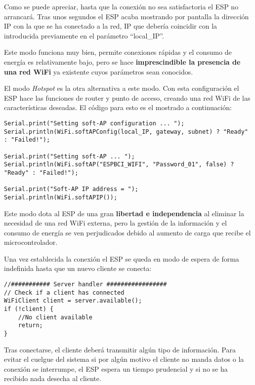 Como se puede apreciar, hasta que la conexión no sea satisfactoria el ESP no arrancará. Tras unos segundos el ESP acaba mostrando por pantalla la dirección IP con la que se ha conectado a la red, IP que debería coincidir con la introducida previamente en el parámetro ``local\_IP''.

Este modo funciona muy bien, permite conexiones rápidas y el consumo de energía es relativamente bajo, pero se hace \textbf{imprescindible la presencia de una red WiFi} ya existente cuyos parámetros sean conocidos.

El modo \textit{Hotspot} es la otra alternativa a este modo. Con esta configuración el ESP hace las funciones de router y punto de acceso, creando una red WiFi de las características deseadas. El código para esto es el mostrado a continuación:

\begin{lstlisting}[label=algoritmo:ESP_Hotspot,style = STM-code,frame=single,caption=Creacion de un punto de acceso en el ESP]
Serial.print("Setting soft-AP configuration ... ");
Serial.println(WiFi.softAPConfig(local_IP, gateway, subnet) ? "Ready" : "Failed!");

Serial.print("Setting soft-AP ... ");
Serial.println(WiFi.softAP("ESPBCI_WIFI", "Password_01", false) ? "Ready" : "Failed!");

Serial.print("Soft-AP IP address = ");
Serial.println(WiFi.softAPIP());
\end{lstlisting}

Este modo dota al ESP de una gran \textbf{libertad e independencia} al eliminar la necesidad de una red WiFi externa, pero la gestión de la información y el consumo de energía se ven perjudicados debido al aumento de carga que recibe el microcontrolador.

Una vez establecida la conexión el ESP se queda en modo de espera de forma indefinida hasta que un nuevo cliente se conecta:

\begin{lstlisting}[label=algoritmo:ESP_Server_handler,style = STM-code,frame=single,caption=Gestión de clientes y peticiones en Arduino]
//########### Server handler #################
// Check if a client has connected
WiFiClient client = server.available();
if (!client) {
	//No client available
	return;
}
\end{lstlisting}

Tras conectarse, el cliente deberá transmitir algún tipo de información. Para evitar el cuelgue del sistema si por algún motivo el cliente no manda datos o la conexión se interrumpe, el ESP espera un tiempo prudencial y si no se ha recibido nada desecha al cliente.

